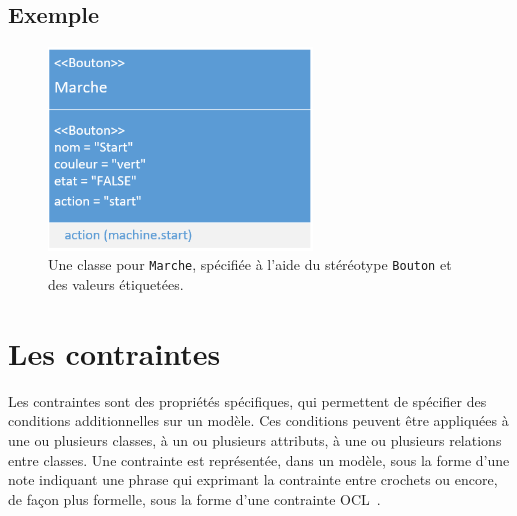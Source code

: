 \subsection*{Exemple}
%
\begin{figure}[H]
    \begin{center}
    \includegraphics[width=7cm]{10_img/chap4/start.PNG}
    \caption{Une classe pour \texttt{Marche}, spécifiée à l'aide du stéréotype \texttt{Bouton} et des valeurs \'etiquet\'ees.}
    \label{fig.uml_marche}
    \end{center}
\end{figure}






\section{Les contraintes}
Les contraintes sont des propriétés spécifiques, qui permettent de sp\'ecifier des conditions additionnelles sur un modèle.
Ces conditions peuvent être appliquées à une ou plusieurs classes, à un ou plusieurs attributs, à une ou plusieurs relations entre classes.
Une contrainte est représent\'ee, dans un modèle, sous la forme d'une note indiquant une phrase qui exprimant la contrainte entre crochets ou encore, de fa\c{c}on plus formelle, sous la forme d'une contrainte OCL~\cite{OCL}.

